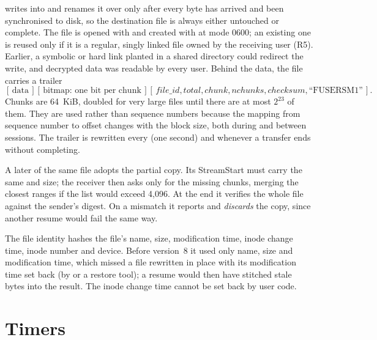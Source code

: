  writes into  and renames it over  only after every byte has
arrived and been synchronised to disk, so the destination file is always either untouched or complete. The
 file is opened with  and created with  at mode 0600; an
existing one is reused only if it is a regular, singly linked file owned by the receiving user (R5). Earlier, a
symbolic or hard link planted in a shared directory could redirect the write, and decrypted data was readable
by every user. Behind the data, the  file carries a trailer
\[
[\,\text{data}\,][\,\text{bitmap: one bit per chunk}\,][\,\mathit{file\_id},\mathit{total},\mathit{chunk},\mathit{nchunks},\mathit{checksum},\text{``FUSERSM1''}\,].
\]
Chunks are 64~KiB, doubled for very large files until there are at most $2^{23}$ of them. They are used rather
than sequence numbers because the mapping from sequence number to offset changes with the block size, both
during and between sessions. The trailer is rewritten every  (one second) and
whenever a transfer ends without completing.

A later  of the same file adopts the partial copy. Its StreamStart must carry the same
 and size; the receiver then asks only for the missing chunks, merging the closest ranges if the
list would exceed 4,096. At the end it verifies the whole file against the sender's digest. On a mismatch it
reports  and \emph{discards} the copy, since another resume would fail the same way.

The file identity hashes the file's name, size, modification time, inode change time, inode number and
device\vviii. Before version~8 it used only name, size and modification time, which missed a file rewritten in
place with its modification time set back (by  or a restore tool); a resume would then have
stitched stale bytes into the result. The inode change time cannot be set back by user code.

\section{Timers}

